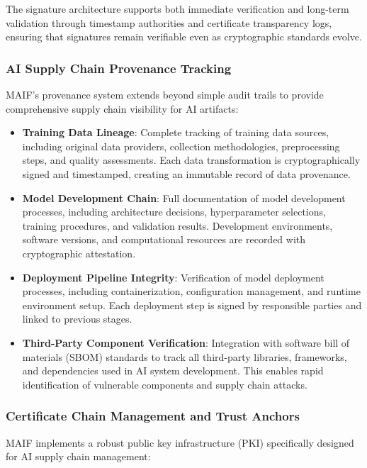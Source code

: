 \documentclass[conference]{IEEEtran}
\begin{document}
The signature architecture supports both immediate verification and long-term validation through timestamp authorities and certificate transparency logs, ensuring that signatures remain verifiable even as cryptographic standards evolve.

\subsubsection{AI Supply Chain Provenance Tracking}

MAIF's provenance system extends beyond simple audit trails to provide comprehensive supply chain visibility for AI artifacts:

\begin{itemize}[leftmargin=*]
\item \textbf{Training Data Lineage}: Complete tracking of training data sources, including original data providers, collection methodologies, preprocessing steps, and quality assessments. Each data transformation is cryptographically signed and timestamped, creating an immutable record of data provenance.

\item \textbf{Model Development Chain}: Full documentation of model development processes, including architecture decisions, hyperparameter selections, training procedures, and validation results. Development environments, software versions, and computational resources are recorded with cryptographic attestation.

\item \textbf{Deployment Pipeline Integrity}: Verification of model deployment processes, including containerization, configuration management, and runtime environment setup. Each deployment step is signed by responsible parties and linked to previous stages.

\item \textbf{Third-Party Component Verification}: Integration with software bill of materials (SBOM) standards to track all third-party libraries, frameworks, and dependencies used in AI system development. This enables rapid identification of vulnerable components and supply chain attacks.
\end{itemize}

\subsubsection{Certificate Chain Management and Trust Anchors}

MAIF implements a robust public key infrastructure (PKI) specifically designed for AI supply chain management:
\end{document}
